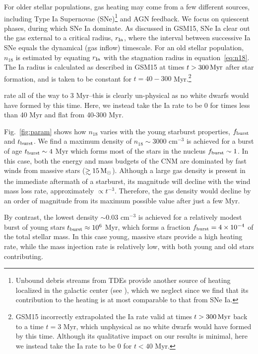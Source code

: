 \documentclass[usenatbib,fleqn]{mnras}
\newcommand\gsim{\mathrel{\rlap{\lower4pt\hbox{\hskip1pt$\sim$}}
    \raise1pt\hbox{$>$}}}
\newcommand{\Msun}{{\rm M_\odot}}
\begin{document}
For older stellar populations, gas heating may come from a few different sources, including Type Ia Supernovae (SNe)\footnote{Unbound debris streams from TDEs provide another source of heating localized in the galactic center (see \citep{Guillochon+2015a}), which we neglect since we find that its contribution to the heating is at most comparable to that from SNe Ia.} and AGN feedback.  We focus on quiescent phases, during which SNe Ia dominate.  As discussed in GSM15, SNe Ia clear out the gas external to a critical radius, $r_{\rm Ia}$, where the interval between successive Ia SNe equals the dynamical (gas inflow) timescale.  For an old stellar population, $n_{18}$ is estimated by equating $r_{\rm Ia}$ with the stagnation radius in equation~\eqref{eq:n18}.  The Ia radius is calculated as described in GSM15 at times $t>300 \,{\rm Myr}$ after star formation, and is taken to be constant for $t = 40-300$ Myr.\footnote{GSM15 incorrectly extrapolated the Ia rate valid at times $t>300 \,{\rm Myr}$ back to a time $t = 3$ Myr, which unphysical as no white dwarfs would have formed by this time.  Although its qualitative impact on our results is minimal, here we instead take the Ia rate to be 0 for $ t < 40$ Myr.}

rate all of the way to 3 Myr--this is clearly un-physical as no white
dwarfs would have formed by this time. Here, we instead take the Ia
rate to be 0 for times less than 40 Myr and flat from 40-300 Myr.

Fig.~\ref{fig:param} shows how $n_{18}$ varies with the young starburst properties, $f_{\rm burst}$ and $t_{\rm burst}$.  We find a maximum density of $n_{18} \sim 3000$ cm$^{-3}$ is achieved for a burst of age $t_{\rm burst} \sim 4$ Myr which forms most of the stars in the nucleus $f_{\rm burst} \sim 1$.  In this case, both the energy and mass budgets of the CNM are dominated by fast winds from massive stars ($\gsim 15 \, \Msun$).  Although a large gas density is present in the immediate aftermath of a starburst, its magnitude will decline with the wind mass loss rate, approximately $\propto t^{-3}$.  Therefore, the gas density would
decline by an order of magnitude from its maximum possible value after just a few Myr.

By contrast, the lowest density $\sim 0.03$ cm$^{-3}$ is achieved for a relatively modest burst of young stars $t_{\rm burst} \approx 10^{6}$ Myr, which forms a fraction $f_{\rm burst} = 4\times 10^{-4}$ of the total stellar mass. In this case young, massive stars provide a high heating rate, while the mass injection rate is relatively low, with both young and old stars contributing.
\end{document}
